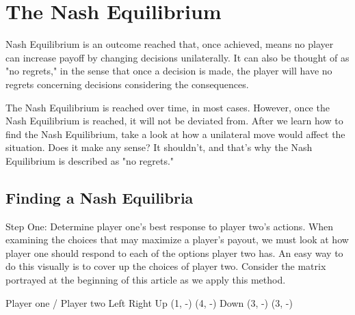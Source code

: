 \documentclass[]{report}
\begin{document}
\section{The Nash Equilibrium}
Nash Equilibrium is an outcome reached that, once achieved, means no player can increase payoff by changing decisions unilaterally. It can also be thought of as "no regrets," in the sense that once a decision is made, the player will have no regrets concerning decisions considering the consequences.

The Nash Equilibrium is reached over time, in most cases. However, once the Nash Equilibrium is reached, it will not be deviated from. After we learn how to find the Nash Equilibrium, take a look at how a unilateral move would affect the situation. Does it make any sense? It shouldn't, and that's why the Nash Equilibrium is described as "no regrets."

\subsection{Finding a Nash Equilibria}
Step One: Determine player one's best response to player two's actions.
When examining the choices that may maximize a player's payout, we must look at how player one should respond to each of the options player two has. An easy way to do this visually is to cover up the choices of player two. Consider the matrix portrayed at the beginning of this article as we apply this method.

Player one / Player two	Left	Right
Up	(1, -)	(4, -)
Down	(3, -)	(3, -)
\end{document}
